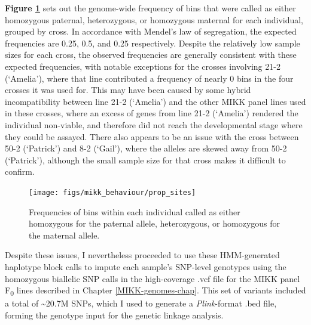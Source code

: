 \documentclass[
]{book}
\begin{document}
\textbf{Figure \ref{fig:F2-prop-sites}} sets out the genome-wide frequency of bins that were called as either homozygous paternal, heterozygous, or homozygous maternal for each individual, grouped by cross. In accordance with Mendel's law of segregation, the expected frequencies are 0.25, 0.5, and 0.25 respectively. Despite the relatively low sample sizes for each cross, the observed frequencies are generally consistent with these expected frequencies, with notable exceptions for the crosses involving \textcolor{21-2 (‘Amelia’)_49B500}{21-2 (‘Amelia’)}, where that line contributed a frequency of nearly 0 bins in the four crosses it was used for. This may have been caused by some hybrid incompatibility between line \textcolor{21-2 (‘Amelia’)_49B500}{21-2 (‘Amelia’)} and the other MIKK panel lines used in these crosses, where an excess of genes from line \textcolor{21-2 (‘Amelia’)_49B500}{21-2 (‘Amelia’)} rendered the individual non-viable, and therefore did not reach the developmental stage where they could be assayed. There also appears to be an issue with the cross between \textcolor{50-2 (‘Patrick’)_BB81FF}{50-2 (‘Patrick’)} and \textcolor{8-2 (‘Gail’)_FF699C}{8-2 (‘Gail’)}, where the alleles are skewed away from \textcolor{50-2 (‘Patrick’)_BB81FF}{50-2 (‘Patrick’)}, although the small sample size for that cross makes it difficult to confirm.



\begin{figure}
\texttt{[image: figs/mikk\_behaviour/prop\_sites]} \caption{Frequencies of bins within each individual called as either homozygous for the paternal allele, heterozygous, or homozygous for the maternal allele.}\label{fig:F2-prop-sites}
\end{figure}

Despite these issues, I nevertheless proceeded to use these HMM-generated haplotype block calls to impute each sample's SNP-level genotypes using the homozygous biallelic SNP calls in the high-coverage .vcf file for the MIKK panel F\textsubscript{0} lines described in Chapter \ref{MIKK-genomes-chap}. This set of variants included a total of \textasciitilde20.7M SNPs, which I used to generate a \emph{Plink}-format .bed file, forming the genotype input for the genetic linkage analysis.
\end{document}
